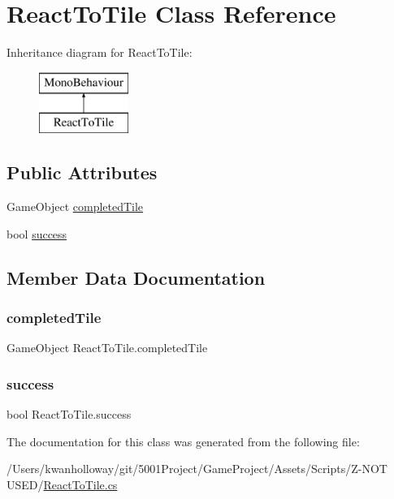 \hypertarget{class_react_to_tile}{}\section{React\+To\+Tile Class Reference}
\label{class_react_to_tile}
Inheritance diagram for React\+To\+Tile\+:\begin{figure}[H]
\begin{center}
\leavevmode
\includegraphics[height=2.000000cm]{class_react_to_tile}
\end{center}
\end{figure}
\subsection*{Public Attributes}
\begin{DoxyCompactItemize}
\item 
Game\+Object \hyperlink{class_react_to_tile_a50e5bd15ebf5838eff2108b94ac952c1}{completed\+Tile}
\item 
bool \hyperlink{class_react_to_tile_a1b41dd133e7cfe46422cb93023eb8408}{success}
\end{DoxyCompactItemize}


\subsection{Member Data Documentation}
\mbox{\label{class_react_to_tile_a50e5bd15ebf5838eff2108b94ac952c1}} 
\subsubsection{\texorpdfstring{completed\+Tile}{completedTile}}
{\footnotesize\ttfamily Game\+Object React\+To\+Tile.\+completed\+Tile}

\mbox{\label{class_react_to_tile_a1b41dd133e7cfe46422cb93023eb8408}} 
\subsubsection{\texorpdfstring{success}{success}}
{\footnotesize\ttfamily bool React\+To\+Tile.\+success}



The documentation for this class was generated from the following file\+:\begin{DoxyCompactItemize}
\item 
/\+Users/kwanholloway/git/5001\+Project/\+Game\+Project/\+Assets/\+Scripts/\+Z-\/\+N\+O\+T U\+S\+E\+D/\hyperlink{_react_to_tile_8cs}{React\+To\+Tile.\+cs}\end{DoxyCompactItemize}
